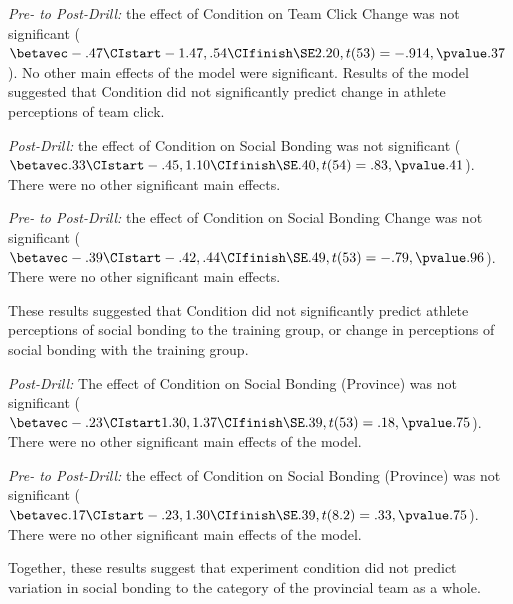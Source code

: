 \textit{Pre- to Post-Drill:} the effect of Condition on Team Click Change was not significant ($\betavec -.47 \CIstart -1.47, .54 \CIfinish \SE 2.20, t(53)= -.914, \pvalue .37$). No other main effects of the model were significant.  Results of the model suggested that Condition did not significantly predict change in athlete perceptions of team click.


\textit{Post-Drill:} the effect of Condition on Social Bonding was not significant ($\betavec .33 \CIstart -.45, 1.10 \CIfinish \SE .40, t(54)= .83, \pvalue .41$). There were no other significant main effects.

\textit{Pre- to Post-Drill:} the effect of Condition on Social Bonding Change was not significant ($\betavec -.39 \CIstart -.42, .44 \CIfinish \SE .49, t(53)= -.79, \pvalue .96$). There were no other significant main effects.

These results suggested that Condition did not significantly predict athlete perceptions of social bonding to the training group, or change in perceptions of social bonding with the training group.



\textit{Post-Drill:}
The effect of Condition on Social Bonding (Province) was not significant ($\betavec -.23 \CIstart 1.30, 1.37 \CIfinish \SE .39, t(53)= .18, \pvalue .75$). There were no other significant main effects of the model.

\textit{Pre- to Post-Drill:} the effect of Condition on Social Bonding (Province) was not significant ($\betavec .17 \CIstart -.23, 1.30 \CIfinish \SE .39, t(8.2)= .33, \pvalue .75$). There were no other significant main effects of the model.

Together, these results suggest that experiment condition did not predict variation in social bonding to the category of the provincial team as a whole.





